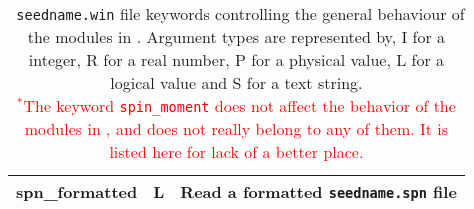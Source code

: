 \begin{table}[hH!]
\begin{center}
\begin{tabular}{|c|c|p{6cm}|}
{\sc spn\_formatted}  & L & 
  Read a formatted {\tt seedname.spn} file\\
 \hline
\end{tabular}
\caption[Parameter file keywords controlling \postw.]  {{\tt
    seedname.win} file keywords controlling the general behaviour of
  the modules in \postw. Argument types are represented by, I for a
  integer, R for a real number, P for a
  physical value, L for a logical value and S for a text string.\\
  \textcolor{red}{$^*$The keyword {\tt spin\_moment} does not affect
    the behavior of the modules in \postw, and does not really belong
    to any of them. It is listed here for lack of a better place.}}
\label{parameter_keywords_postw90}
\end{center}
\end{table}


